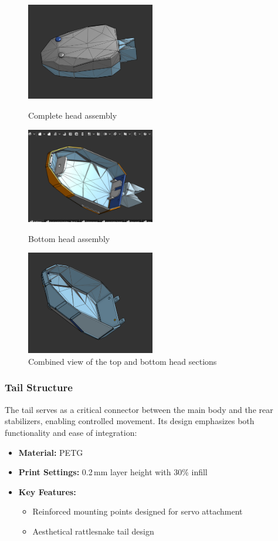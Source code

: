 \documentclass[12pt,a4paper]{report}
\begin{document}
\begin{figure}[H]
\centering
\includegraphics[width=0.5\textwidth]{media/Head.png}
\caption{Complete head assembly}
\par\vspace{4 mm}
\includegraphics[width=0.5\textwidth]{media/Bottom-Head.png}
\caption{Bottom head assembly}
\par\vspace{4 mm}
\includegraphics[width=0.5\textwidth]{media/top-head.png}
\caption{Combined view of the top and bottom head sections}
\end{figure}

\FloatBarrier
\subsubsection{Tail Structure}
The tail serves as a critical connector between the main body and the rear stabilizers, enabling controlled movement. Its design emphasizes both functionality and ease of integration:
\begin{itemize}
    \item \textbf{Material:} PETG
    \item \textbf{Print Settings:} 0.2\,mm layer height with 30\% infill
    \item \textbf{Key Features:}
    \begin{itemize}
        \item Reinforced mounting points designed for servo attachment
        \item Aesthetical rattlesnake tail design
    \end{itemize}
\end{itemize}
\end{document}
